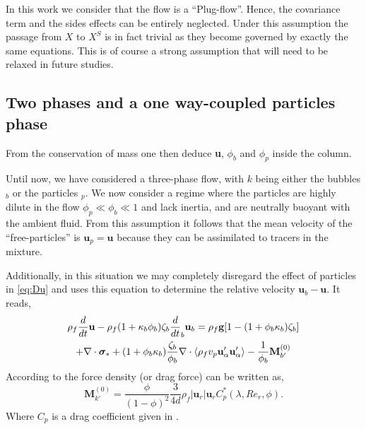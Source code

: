 In this work we consider that the flow is a ``Plug-flow''. 
Hence, the covariance term and the sides effects can be entirely neglected. 
Under this assumption the passage from $X$ to $X^S$ is in fact trivial as they become governed by exactly the same equations. 
This is of course a strong assumption that will need to be relaxed in future studies. 


\subsection{Two phases and a one way-coupled particles phase}

From the conservation of mass one then deduce \textbf{u}, $\phi_b$ and $\phi_p$ inside the column. 

Until now, we have considered a three-phase flow, with $k$ being either the bubbles $_b$ or the particles $_p$. 
We now consider a regime where the particles are highly dilute in the flow  $\phi_p \ll \phi_b \ll 1$ and lack inertia, and are neutrally buoyant with the ambient fluid. 
From this assumption it follows that the mean velocity of the ``free-particles'' is $\textbf{u}_p = \textbf{u}$ because they can be assimilated to tracers in the mixture. 

Additionally, in this situation we may completely disregard the effect of particles in \ref{eq:Du} and uses this equation to determine the relative velocity $\textbf{u}_b - \textbf{u}$. 
It reads, 
\begin{multline*}
    \rho_f  \frac{d}{dt} \textbf{u}
    - \rho_f (1+\kappa_b\phi_b) \zeta_b \frac{d}{dt}_b \textbf{u}_b
    =
    \rho_f \textbf{g}[1- (1+\phi_b\kappa_b)\zeta_b]\\
    +\mathbf{\nabla}\cdot \bm\sigma_*
    +(1+\phi_b\kappa_b)\frac{\zeta_b}{\phi_b}\mathbf{\nabla}\cdot \left<\rho_f v_p \textbf{u}_\alpha' \textbf{u}_\alpha'\right>
    - \frac{1}{\phi_b}  \textbf{M}_{b'}^{(0)}
\end{multline*}
According to \citet[Chapter 8]{fintzi2025} the force density (or drag force) can be written as,
\begin{equation}
    \textbf{M}_{k'}^{(0)} 
    = \frac{\phi}{(1-\phi)^2} \frac{3}{4d}\rho_f |\textbf{u}_r| \textbf{u}_r  C_p^*(\lambda,Re_{r},\phi). 
\end{equation}
Where $C_p$ is a drag coefficient given in \citet[Chapter 8]{fintzi2025}. 


